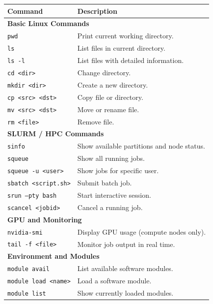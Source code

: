 \documentclass[11pt]{article}
\begin{document}
\begin{table}[h]
\centering
\small
\renewcommand{\arraystretch}{1.2}
\begin{tabular}{p{4cm} p{9cm}}
\hline
\textbf{Command} & \textbf{Description} \\
\hline

\multicolumn{2}{l}{\textbf{Basic Linux Commands}} \\

\texttt{pwd} & Print current working directory. \\
\texttt{ls} & List files in current directory. \\
\texttt{ls -l} & List files with detailed information. \\
\texttt{cd <dir>} & Change directory. \\
\texttt{mkdir <dir>} & Create a new directory. \\
\texttt{cp <src> <dst>} & Copy file or directory. \\
\texttt{mv <src> <dst>} & Move or rename file. \\
\texttt{rm <file>} & Remove file. \\

\multicolumn{2}{l}{\textbf{SLURM / HPC Commands}} \\

\texttt{sinfo} & Show available partitions and node status. \\
\texttt{squeue} & Show all running jobs. \\
\texttt{squeue -u <user>} & Show jobs for specific user. \\
\texttt{sbatch <script.sh>} & Submit batch job. \\
\texttt{srun --pty bash} & Start interactive session. \\
\texttt{scancel <jobid>} & Cancel a running job. \\

\multicolumn{2}{l}{\textbf{GPU and Monitoring}} \\

\texttt{nvidia-smi} & Display GPU usage (compute nodes only). \\
\texttt{tail -f <file>} & Monitor job output in real time. \\

\multicolumn{2}{l}{\textbf{Environment and Modules}} \\

\texttt{module avail} & List available software modules. \\
\texttt{module load <name>} & Load a software module. \\
\texttt{module list} & Show currently loaded modules. \\


\end{tabular}
\end{table}
\end{document}
